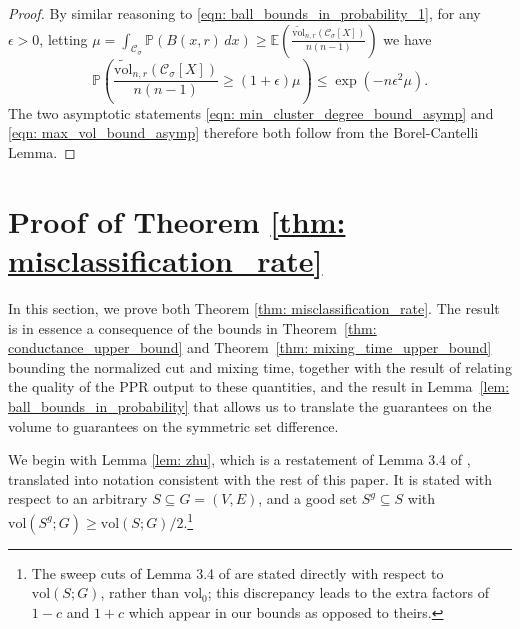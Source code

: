 \documentclass[11pt,twoside]{article}
\newcommand{\vol}{\mathrm{vol}}
\newcommand{\1}{\mathbf{1}}
\newcommand{\Xbf}{X}             %
\newcommand{\Pbb}{\mathbb{P}}
\newcommand{\Ebb}{\mathbb{E}}
\newcommand{\Cset}{\mathcal{C}}
\newcommand{\Csig}{\Cset_{\sigma}}
\newcommand{\dx}{\,dx}
\begin{document}
\begin{proof}
	By similar reasoning to \eqref{eqn: ball_bounds_in_probability_1}, for any $\epsilon > 0$, letting $\mu = \int_{\Csig} \Pbb(B(x,r) \dx) \geq \Ebb\left(\frac{\widetilde{\vol}_{n,r}(\Csig[\Xbf])}{n(n-1)}\right)$ we have
	\begin{equation*}
	\Pbb\left(\frac{\widetilde{\vol}_{n,r}(\Csig[\Xbf])}{n(n-1)} \geq (1 + \epsilon)\mu \right) \leq \exp(-n\epsilon^2\mu).
	\end{equation*}
	The two asymptotic statements \eqref{eqn: min_cluster_degree_bound_asymp} and \eqref{eqn: max_vol_bound_asymp} therefore both follow from the Borel-Cantelli Lemma.
\end{proof}




\section{Proof of Theorem \ref{thm: misclassification_rate}}
\label{sec: proof_of_misclassification_rate}
In this section, we prove both Theorem \ref{thm: misclassification_rate}.
The result is in essence a consequence of the bounds in Theorem~\ref{thm: conductance_upper_bound} 
and Theorem~\ref{thm: mixing_time_upper_bound} bounding the normalized cut and mixing time, together with the result of \citet{zhu2013} relating the quality of the PPR output to these quantities, and the result in Lemma~\ref{lem: ball_bounds_in_probability}
that allows us to translate the guarantees on the volume to guarantees on the symmetric set difference. 


We begin with Lemma \ref{lem: zhu}, which is a restatement of Lemma 3.4 of \citet{zhu2013}, translated into notation consistent with the rest of this paper. It is stated with respect to an arbitrary $S \subseteq G = (V,E)$, and a good set $S^g \subseteq S$ with $\vol(S^g; G) \geq \vol(S; G)/2$.\footnote{The sweep cuts of Lemma 3.4 of \cite{zhu2013} are stated directly with respect to $\vol(S;G)$, rather than $\vol_0$; this discrepancy leads to the extra factors of $1 - c$ and $1 + c$ which appear in our bounds as opposed to theirs.}
\end{document}
